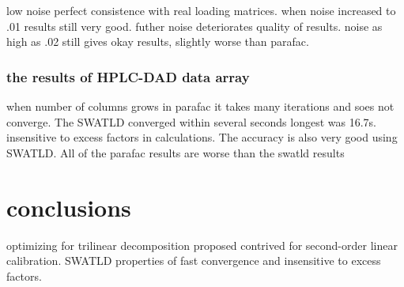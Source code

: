 \documentclass[10pt, draft]{article}
\begin{document}
low noise perfect consistence with real loading matrices.  when noise increased to .01 results still very good.  futher noise deteriorates quality of results.  noise as high as .02 still gives okay results, slightly worse than parafac.  

\subsubsection{the results of HPLC-DAD data array}
	when number of columns grows in parafac it takes many iterations and soes not converge.  The SWATLD converged within several seconds longest was 16.7s.  insensitive to excess factors in calculations.  The accuracy is also very good using SWATLD.  All of the parafac results are worse than the swatld results
	
	\section{conclusions}
	optimizing for trilinear decomposition proposed contrived for second-order linear calibration.  SWATLD properties of fast convergence and insensitive to excess factors.  
\end{document}
